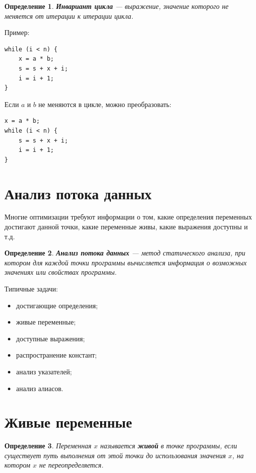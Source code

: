 \documentclass[12pt,a4paper]{article}
\newtheorem{definition}{Определение}
\begin{document}
\begin{definition}
\textbf{Инвариант цикла} --- выражение, значение которого не меняется от итерации к итерации цикла.
\end{definition}

Пример:

\begin{lstlisting}
while (i < n) {
    x = a * b;
    s = s + x + i;
    i = i + 1;
}
\end{lstlisting}

Если $a$ и $b$ не меняются в цикле, можно преобразовать:

\begin{lstlisting}
x = a * b;
while (i < n) {
    s = s + x + i;
    i = i + 1;
}
\end{lstlisting}

\section{Анализ потока данных}

Многие оптимизации требуют информации о том, какие определения переменных достигают данной точки, какие переменные живы, какие выражения доступны и т.д.

\begin{definition}
\textbf{Анализ потока данных} --- метод статического анализа, при котором для каждой точки программы вычисляется информация о возможных значениях или свойствах программы.
\end{definition}

Типичные задачи:
\begin{itemize}
    \item достигающие определения;
    \item живые переменные;
    \item доступные выражения;
    \item распространение констант;
    \item анализ указателей;
    \item анализ алиасов.
\end{itemize}

\section{Живые переменные}

\begin{definition}
Переменная $x$ называется \textbf{живой} в точке программы, если существует путь выполнения от этой точки до использования значения $x$, на котором $x$ не переопределяется.
\end{definition}
\end{document}
